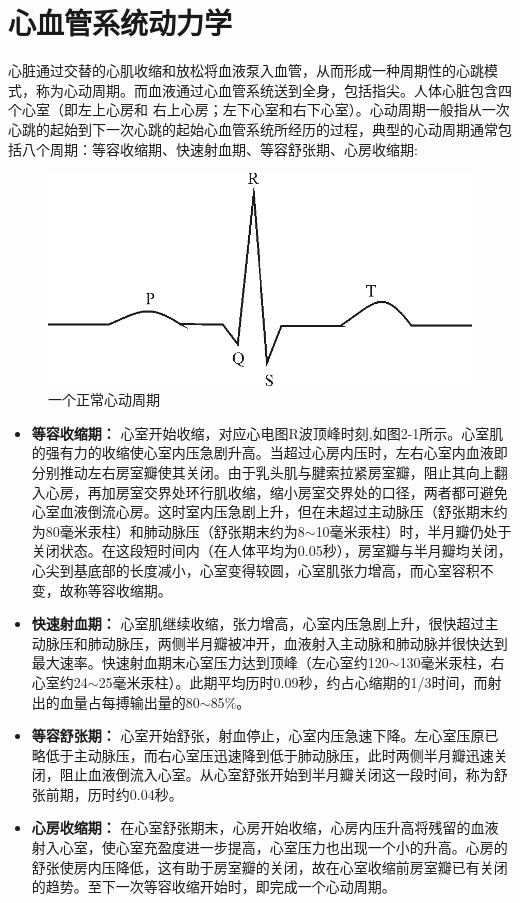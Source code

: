 \section{心血管系统动力学}
{心脏通过交替的心肌收缩和放松将血液泵入血管，从而形成一种周期性的心跳模式，称为心动周期。而血液通过心血管系统送到全身，包括指尖。人体心脏包含四个心室（即左上心房和 右上心房；左下心室和右下心室）。心动周期一般指从一次心跳的起始到下一次心跳的起始心血管系统所经历的过程\cite{2006The}，典型的心动周期通常包括八个周期：等容收缩期、快速射血期、等容舒张期、心房收缩期:}
\par
\begin{figure}[htbp]
  \centering
  \includegraphics[width=0.5\linewidth]{images/R.png}
  \caption{一个正常心动周期\cite{2018sun}}\label{2-1} %
\end{figure}
\par
\begin{itemize}
\item {\bf{等容收缩期}：} {心室开始收缩，对应心电图R波顶峰时刻,如图2-1所示。心室肌的强有力的收缩使心室内压急剧升高。当超过心房内压时，左右心室内血液即分别推动左右房室瓣使其关闭。由于乳头肌与腱索拉紧房室瓣，阻止其向上翻入心房，再加房室交界处环行肌收缩，缩小房室交界处的口径，两者都可避免心室血液倒流心房。这时室内压急剧上升，但在未超过主动脉压（舒张期末约为80毫米汞柱）和肺动脉压（舒张期末约为8$\sim$10毫米汞柱）时，半月瓣仍处于关闭状态。在这段短时间内（在人体平均为0.05秒），房室瓣与半月瓣均关闭，心尖到基底部的长度减小，心室变得较圆，心室肌张力增高，而心室容积不变，故称等容收缩期。}
\item {\bf{快速射血期}：} {心室肌继续收缩，张力增高，心室内压急剧上升，很快超过主动脉压和肺动脉压，两侧半月瓣被冲开，血液射入主动脉和肺动脉并很快达到最大速率。快速射血期末心室压力达到顶峰（左心室约120$\sim$130毫米汞柱，右心室约24$\sim$25毫米汞柱）。此期平均历时0.09秒，约占心缩期的1/3时间，而射出的血量占每搏输出量的80$\sim$85$\%$。 }
\item {\bf{等容舒张期}：} {心室开始舒张，射血停止，心室内压急速下降。左心室压原已略低于主动脉压，而右心室压迅速降到低于肺动脉压，此时两侧半月瓣迅速关闭，阻止血液倒流入心室。从心室舒张开始到半月瓣关闭这一段时间，称为舒张前期，历时约0.04秒。}
\item {\bf{心房收缩期}：} {在心室舒张期末，心房开始收缩，心房内压升高将残留的血液射入心室，使心室充盈度进一步提高，心室压力也出现一个小的升高。心房的舒张使房内压降低，这有助于房室瓣的关闭，故在心室收缩前房室瓣已有关闭的趋势。至下一次等容收缩开始时，即完成一个心动周期。}
\end{itemize}

